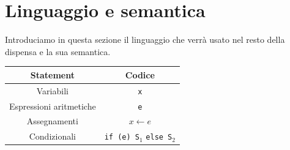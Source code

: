 \documentclass{article}
\begin{document}
    \section{Linguaggio e semantica}
        Introduciamo in questa sezione il linguaggio che verrà usato nel resto della dispensa e la sua semantica.

        \begin{center}
            \begin{tabular}{cc}
                \hline
                \textbf{Statement} & \textbf{Codice} \\
                \hline
                \hline
                Variabili & \lstinline|x| \\
                Espressioni aritmetiche & \lstinline|e| \\
                Assegnamenti & $x \leftarrow e$ \\
                Condizionali & \lstinline|if (e) S|$_1$ \lstinline|else S|$_2$ \\
                \hline
            \end{tabular}
        \end{center}
\end{document}
